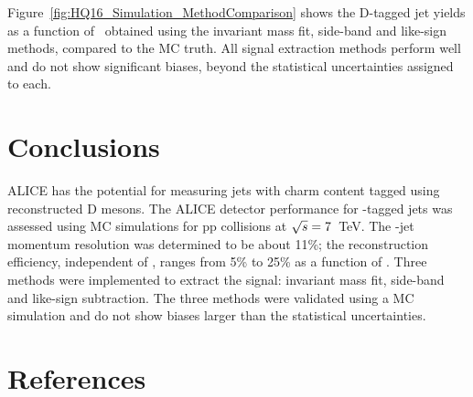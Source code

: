 \documentclass[a4paper]{jpconf}
\begin{document}
Figure~\ref{fig:HQ16_Simulation_MethodComparison} shows the D-tagged jet yields as a function of \ptchjetdet\ obtained using the invariant mass fit, 
side-band and like-sign methods, compared to the MC truth. All signal extraction methods perform well and do not show significant biases, beyond the statistical uncertainties assigned to each.

\section{Conclusions}
ALICE has the potential for measuring jets with charm content tagged using reconstructed D mesons.
The ALICE detector performance for \Dzero-tagged jets was assessed using MC simulations
for pp collisions at $\sqrt{s}=7$~TeV. The \Dzero-jet momentum resolution was determined to be about 11\%; the reconstruction efficiency, independent of \ptchjet, ranges from 5\% to 25\% as a function of \ptd.
Three methods were implemented to extract the signal: invariant mass fit, side-band and like-sign subtraction.
The three methods were validated using a MC simulation and do not show biases larger than the statistical uncertainties.

\section*{References}
{}

\end{document}
